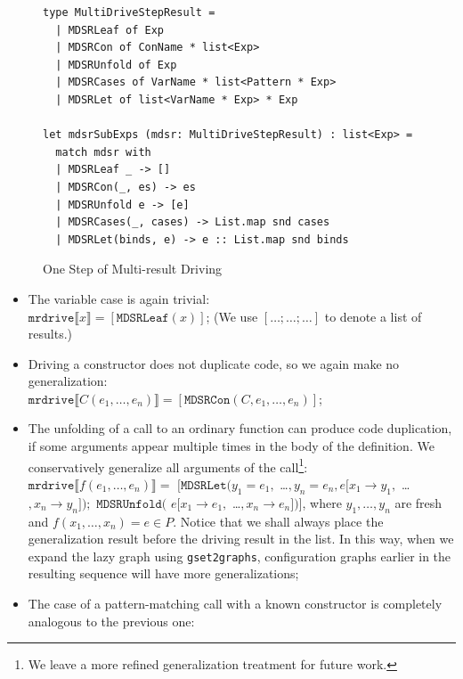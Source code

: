 \documentclass[submission,copyright,creativecommons]{eptcs}
\begin{document}
\begin{figure}
\begin{lstlisting}
type MultiDriveStepResult =
  | MDSRLeaf of Exp
  | MDSRCon of ConName * list<Exp>
  | MDSRUnfold of Exp
  | MDSRCases of VarName * list<Pattern * Exp>
  | MDSRLet of list<VarName * Exp> * Exp

let mdsrSubExps (mdsr: MultiDriveStepResult) : list<Exp> =
  match mdsr with
  | MDSRLeaf _ -> []
  | MDSRCon(_, es) -> es
  | MDSRUnfold e -> [e]
  | MDSRCases(_, cases) -> List.map snd cases
  | MDSRLet(binds, e) -> e :: List.map snd binds
\end{lstlisting}
\caption{One Step of Multi-result Driving}
\label{fig:MultiDriveStepResult}
\end{figure}

\begin{itemize}
  \item The variable case is again trivial: \\
    $\mathtt{mrdrive} \llbracket x \rrbracket = [\mathtt{MDSRLeaf}(x)]$;
    (We use $[\ldots; \ldots; \ldots]$ to denote a list of results.)
  \item Driving a constructor does not duplicate code, so we again make no generalization: \\ 
    $\mathtt{mrdrive} \llbracket C(e_1, \ldots, e_n) \rrbracket = [\mathtt{MDSRCon}(C, e_1, \ldots, e_n)]$;
  \item The unfolding of a call to an ordinary function can produce code duplication, if some arguments appear
    multiple times in the body of the definition. 
    We conservatively generalize all arguments of the call\footnote{We leave a more refined generalization treatment for future work.}: \\
    $\mathtt{mrdrive} \llbracket f(e_1, \ldots, e_n) \rrbracket =$ 
      $[\mathtt{MDSRLet}(y_1=e_1,$ \ldots$, y_n=e_n, e [ x_1\rightarrow y_1,$ \ldots$, x_n\rightarrow y_n ]); $ 
      $\mathtt{MDSRUnfold}($ $e [ x_1\rightarrow e_1,$ \ldots$, x_n\rightarrow e_n ])]$,
    where $y_1, \ldots, y_n$ are fresh and $f(x_1, \ldots, x_n) = e \in P$.
    Notice that we shall always place the generalization result before the driving result in the list.
    In this way, when we expand the lazy graph using \verb|gset2graphs|, configuration graphs
    earlier in the resulting sequence will have more generalizations;
  \item The case of a pattern-matching call with a known constructor is completely
    analogous to the previous one: \\

\end{itemize}
\end{document}
